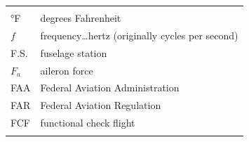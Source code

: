 \documentclass[
]{book}
\begin{document}
\begin{longtable}[]{@{}ll@{}}
\begin{minipage}[t]{0.47\columnwidth}
\end{minipage}\tabularnewline
\begin{minipage}[t]{0.47\columnwidth}\raggedright
°F\strut
\end{minipage} & \begin{minipage}[t]{0.47\columnwidth}\raggedright
degrees Fahrenheit\strut
\end{minipage}\tabularnewline
\begin{minipage}[t]{0.47\columnwidth}\raggedright
\(f\)\strut
\end{minipage} & \begin{minipage}[t]{0.47\columnwidth}\raggedright
frequency\ldots hertz (originally cycles per second)\strut
\end{minipage}\tabularnewline
\begin{minipage}[t]{0.47\columnwidth}\raggedright
F.S.\strut
\end{minipage} & \begin{minipage}[t]{0.47\columnwidth}\raggedright
fuselage station\strut
\end{minipage}\tabularnewline
\begin{minipage}[t]{0.47\columnwidth}\raggedright
\(F_a\)\strut
\end{minipage} & \begin{minipage}[t]{0.47\columnwidth}\raggedright
aileron force\strut
\end{minipage}\tabularnewline
\begin{minipage}[t]{0.47\columnwidth}\raggedright
FAA\strut
\end{minipage} & \begin{minipage}[t]{0.47\columnwidth}\raggedright
Federal Aviation Administration\strut
\end{minipage}\tabularnewline
\begin{minipage}[t]{0.47\columnwidth}\raggedright
FAR\strut
\end{minipage} & \begin{minipage}[t]{0.47\columnwidth}\raggedright
Federal Aviation Regulation\strut
\end{minipage}\tabularnewline
\begin{minipage}[t]{0.47\columnwidth}\raggedright
FCF\strut
\end{minipage} & \begin{minipage}[t]{0.47\columnwidth}\raggedright
functional check flight\strut
\end{minipage}\tabularnewline
\begin{minipage}[t]{0.47\columnwidth}\raggedright

\end{minipage}
\end{longtable}
\end{document}
